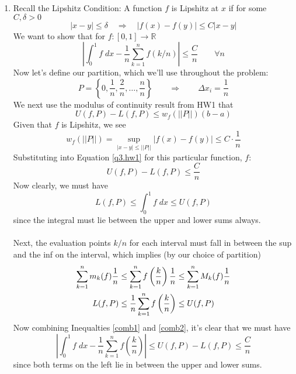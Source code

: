 \documentclass[12pt]{article}
\theoremstyle{plain}
\theoremstyle{definition}
\theoremstyle{remark}
\begin{document}
\begin{enumerate}
\newpage
\item Recall the Lipshitz Condition: A function $f$ is Lipshitz at $x$ if for some $C, \delta >0$
\begin{equation}
    |x-y| \leq \delta \quad \Rightarrow \quad
    |f(x) - f(y)| \leq C|x-y|
\end{equation}
We want to show that for $f: [0,1] \rightarrow \mathbb{R}$
\begin{equation}
    \label{q3.torewrite}
    \left\lvert \int^1_0 f \; dx - \frac{1}{n} \sum^n_{k=1}
        f(k/n) \right\rvert \leq \frac{C}{n} \qquad \forall n
\end{equation}
Now let's define our partition, which we'll use throughout the problem:
\begin{equation}
    P = \left\{ 0, \frac{1}{n},\frac{2}{n}, \ldots,\frac{n}{n}\right\}
    \qquad \Rightarrow \qquad
    \Delta x_i = \frac{1}{n}
\end{equation}
We next use the modulus of continuity result from HW1 that 
\begin{equation}
    \label{q3.hw1}
    U(f,P) - L(f,P) \leq w_f\left(||P||\right) (b-a) 
\end{equation}
Given that $f$ is Lipshitz, we see
    \[ w_f\left(||P||\right) = \sup_{|x-y|\leq ||P||}
        |f(x) - f(y)| \leq C \cdot \frac{1}{n} \]
Substituting into Equation \ref{q3.hw1} for this particular function, $f$:
    \[ U(f,P) - L(f,P) \leq \frac{C}{n} \]
Now clearly, we must have 
\begin{equation}
    \label{comb1}
     L(f,P) \leq \int^1_0 f \; dx \leq U(f,P) 
\end{equation}
since the integral must lie between the upper and lower sums always.
\\
\\
Next, the evaluation points $k/n$ for each interval must fall in between the sup and the inf on the interval, which implies (by our choice of partition)
\begin{align}
    \sum^n_{k=1} m_k(f) \frac{1}{n} 
        &\leq \sum^n_{k=1} f\left(\frac{k}{n}
        \right) \frac{1}{n} \leq 
        \sum^n_{k=1} M_k(f) \frac{1}{n}  \notag \\
    L(f,P) &\leq \frac{1}{n} \sum^n_{k=1} f\left(\frac{k}{n}
        \right) \leq U(f,P) \label{comb2}
\end{align}
Now combining Inequalties \ref{comb1} and \ref{comb2}, it's clear that we must have
    \[ \left\lvert \int^1_0 f \; dx -  
        \frac{1}{n} \sum^n_{k=1} f\left(\frac{k}{n} \right) 
        \right\rvert\leq 
        U(f,P) - L(f,P) \leq \frac{C}{n} \]
since both terms on the left lie in between the upper and lower sums.



\end{enumerate}
\end{document}
